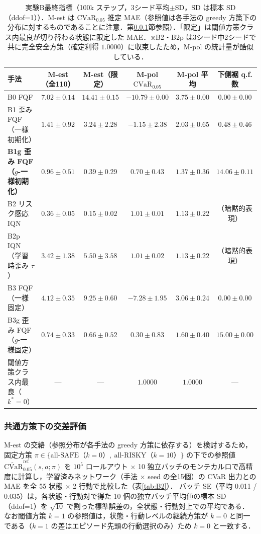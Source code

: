\documentclass[a4paper,10pt]{jsarticle}
\theoremstyle{definition}
\newcommand{\CVaR}{\mathrm{CVaR}}
\begin{document}
\begin{table}[htbp]
\centering
\caption{実験B最終指標（100k ステップ，3シード平均$\pm$SD，SD は標本 SD（ddof=1））．M-est は $\CVaR_{0.05}$ 推定 MAE（参照値は各手法の greedy 方策下の分布に対するものであることに注意．第\ref{subsec:cross}節参照）．「限定」は閾値方策クラス内最良が切り替わる状態に限定した MAE．※B2・B2p は3シード中2シードで共に完全安全方策（確定利得 $1.0000$）に収束したため，M-pol の統計量が酷似している．}
\label{tab:B1}
\small
\setlength{\tabcolsep}{2.5pt}
\begin{tabular}{lccccc}
\toprule
手法 & M-est（全110） & M-est（限定） & M-pol $\CVaR_{0.05}$ & M-pol 平均 & 下側裾 q.f. 数\\
\midrule
B0 FQF & $7.02\pm0.14$ & $14.41\pm0.15$ & $-10.79\pm0.00$ & $3.75\pm0.00$ & $0.00\pm0.00$\\
B1 歪み FQF（一様初期化） & $1.41\pm0.92$ & $3.24\pm2.28$ & $-1.15\pm2.38$ & $2.03\pm0.65$ & $0.48\pm0.46$\\
\textbf{B1g 歪み FQF（$g$-一様初期化）} & $\mathbf{0.96\pm0.51}$ & $\mathbf{0.39\pm0.29}$ & $\mathbf{0.70\pm0.43}$ & $1.37\pm0.36$ & $\mathbf{14.06\pm0.11}$\\
B2 リスク感応 IQN & $0.36\pm0.05$ & $0.15\pm0.02$ & $1.01\pm0.01$ & $1.13\pm0.22$ & （暗黙的表現）\\
B2p IQN（学習時歪み $\tau$） & $3.42\pm1.38$ & $5.50\pm3.58$ & $1.01\pm0.02$ & $1.13\pm0.22$ & （暗黙的表現）\\
\midrule
B3 FQF（一様固定） & $4.12\pm0.35$ & $9.25\pm0.60$ & $-7.28\pm1.95$ & $3.06\pm0.24$ & $0.00\pm0.00$\\
B3g 歪み FQF（$g$-一様固定） & $0.74\pm0.33$ & $0.66\pm0.52$ & $0.30\pm0.83$ & $1.60\pm0.40$ & $15.00\pm0.00$\\
\midrule
閾値方策クラス内最良（$k^*=0$） & --- & --- & $1.0000$ & $1.0000$ & ---\\
\bottomrule
\end{tabular}
\end{table}

\subsubsection{共通方策下の交差評価}
\label{subsec:cross}
M-est の交絡（参照分布が各手法の greedy 方策に依存する）を検討するため，固定方策 $\pi\in\{\text{all-SAFE}（k=0）,\ \text{all-RISKY}（k=10）\}$ の下での参照値 $\widetilde{\mathrm{CVaR}}_{0.05}^{\mathrm{ref}}(s,a;\pi)$ を $10^5$ ロールアウト $\times$ 10 独立バッチのモンテカルロで高精度に計算し，学習済みネットワーク（手法 $\times$ seed の全15個）の CVaR 出力との MAE を全 55 状態 $\times$ 2 行動で比較した（表\ref{tab:B2}）．
バッチ SE（平均 0.011 / 0.035）は，各状態・行動対で得た 10 個の独立バッチ平均値の標本 SD（ddof=1）を $\sqrt{10}$ で割った標準誤差の，全状態・行動対上での平均である．
なお閾値方策 $k=1$ の参照値は，状態・行動レベルの継続方策が $k=0$ と同一である（$k=1$ の差はエピソード先頭の行動選択のみ）ため $k=0$ と一致する．
\end{document}
